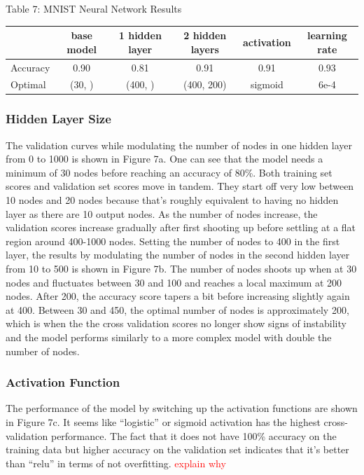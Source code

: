 \documentclass{article}
\newcommand\todo[1]{\textcolor{red}{#1}}
\begin{document}
\begin{table}
	
	\centering
	Table 7: MNIST Neural Network Results\\
	\begin{tabular}{ l c c c c c}
		\hline
		& base model & 1 hidden layer & 2 hidden layers & activation & learning rate \\
		\hline
		Accuracy & 0.90 & 0.81 & 0.91 & 0.91 & 0.93\\
		Optimal & (30, ) & (400, ) & (400, 200) & sigmoid & 6e-4 \\
		
		
		\hline 
	\end{tabular}
\end{table}

			

\subsubsection*{Hidden Layer Size}

The validation curves while modulating the number of nodes in one hidden layer from 0 to 1000 is shown in Figure 7a. One can see that the model needs a minimum of 30 nodes before reaching an accuracy of 80\%. Both training set scores and validation set scores move in tandem. They start off very low between 10 nodes and 20 nodes because that's roughly equivalent to having no hidden layer as there are 10 output nodes. As the number of nodes increase, the validation scores increase gradually after first shooting up before settling at a flat region around 400-1000 nodes. Setting the number of nodes to 400 in the first layer, the results by modulating the number of nodes in the second hidden layer from 10 to 500 is shown in Figure 7b. The number of nodes shoots up when at 30 nodes and fluctuates between 30 and 100 and reaches a local maximum at 200 nodes. After 200, the accuracy score tapers a bit before increasing slightly again at 400. Between 30 and 450, the optimal number of nodes is approximately 200, which is when the the cross validation scores no longer show signs of instability and the model performs similarly to a more complex model with double the number of nodes. 

\subsubsection*{Activation Function}
The performance of the model by switching up the activation functions are shown in Figure 7c. It seems like ``logistic'' or sigmoid activation has the highest cross-validation performance. The fact that it does not have 100\% accuracy on the training data but higher accuracy on the validation set indicates that it's better than ``relu'' in terms of not overfitting. \todo{ explain why }
\end{document}
